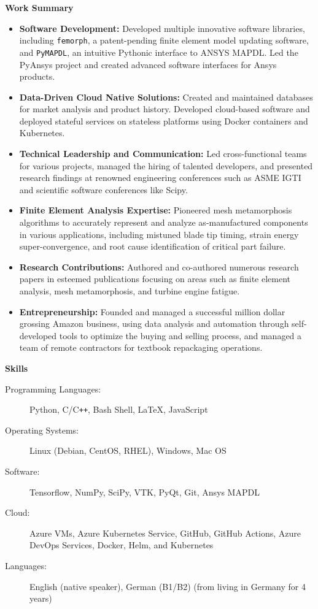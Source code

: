 \documentclass[letterpaper,11pt]{article}
\newcommand{\resheading}[1]{{\large \colorbox{mygrey}{\begin{minipage}{\textwidth}{\textbf{#1 \vphantom{p\^{E}}}}\end{minipage}}}}
\begin{document}
\resheading{Work Summary}
\begin{itemize}
  \item \textbf{Software Development:} Developed multiple innovative software libraries, including \texttt{femorph}, a patent-pending finite element model updating software, and \texttt{PyMAPDL}, an intuitive Pythonic interface to ANSYS MAPDL. Led the PyAnsys project and created advanced software interfaces for Ansys products.
  \item \textbf{Data-Driven Cloud Native Solutions:} Created and maintained databases for market analysis and product history. Developed cloud-based software and deployed stateful services on stateless platforms using Docker containers and Kubernetes.
  \item \textbf{Technical Leadership and Communication:} Led cross-functional teams for various projects, managed the hiring of talented developers, and presented research findings at renowned engineering conferences such as ASME IGTI and scientific software conferences like Scipy.
  \item \textbf{Finite Element Analysis Expertise:} Pioneered mesh metamorphosis algorithms to accurately represent and analyze as-manufactured components in various applications, including mistuned blade tip timing, strain energy super-convergence, and root cause identification of critical part failure.
  \item \textbf{Research Contributions:} Authored and co-authored numerous research papers in esteemed publications focusing on areas such as finite element analysis, mesh metamorphosis, and turbine engine fatigue.
  \item \textbf{Entrepreneurship:} Founded and managed a successful million dollar grossing Amazon business, using data analysis and automation through self-developed tools to optimize the buying and selling process, and managed a team of remote contractors for textbook repackaging operations.
\end{itemize}

\resheading{Skills}

\begin{description}
\item[Programming Languages:] Python, C/C{}\verb!++!, Bash Shell, \LaTeX, JavaScript
\item[Operating Systems:] Linux (Debian, CentOS, RHEL), Windows, Mac OS
\item[Software:] Tensorflow, NumPy, SciPy, VTK, PyQt, Git, Ansys MAPDL
\item[Cloud:] Azure VMs, Azure Kubernetes Service, GitHub, GitHub Actions, Azure DevOps Services, Docker, Helm, and Kubernetes
\item [Languages:] English (native speaker), German (B1/B2) (from living in Germany for 4 years)
\end{description}
\end{document}
